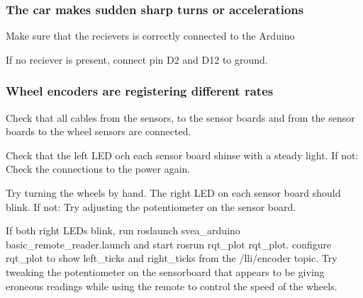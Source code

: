 \subsubsection*{The car makes sudden sharp turns or accelerations}


\begin{DoxyEnumerate}
\item Make sure that the recievers is correctly connected to the Arduino
\item If no reciever is present, connect pin D2 and D12 to ground.
\end{DoxyEnumerate}

\subsubsection*{Wheel encoders are registering different rates}


\begin{DoxyEnumerate}
\item Check that all cables from the sensors, to the sensor boards and from the sensor boards to the wheel sensors are connected.
\item Check that the left L\+ED och each sensor board shinse with a steady light. If not\+: Check the connections to the power again.
\item Try turning the wheels by hand. The right L\+ED on each sensor board should blink. If not\+: Try adjusting the potentiometer on the sensor board.
\item If both right L\+E\+Ds blink, run {\ttfamily roslaunch svea\+\_\+arduino basic\+\_\+remote\+\_\+reader.\+launch} and start {\ttfamily rosrun rqt\+\_\+plot rqt\+\_\+plot}. configure rqt\+\_\+plot to show {\ttfamily left\+\_\+ticks} and {\ttfamily right\+\_\+ticks} from the {\ttfamily /lli/encoder} topic. Try tweaking the potentiometer on the sensorboard that appears to be giving eroneous readings while using the remote to control the speed of the wheels. 
\end{DoxyEnumerate}